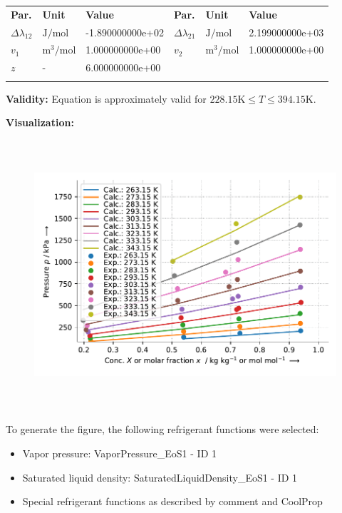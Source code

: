 \begin{longtable}[l]{lll|lll}
\toprule
\addlinespace
\textbf{Par.} & \textbf{Unit} & \textbf{Value} &	\textbf{Par.} & \textbf{Unit} & \textbf{Value} \\
\addlinespace
\midrule
\endhead

\bottomrule
\endfoot
\bottomrule
\endlastfoot
\addlinespace

$\Delta\lambda_{12}$ & $\si{\joule\per\mole}$ & -1.890000000e+02 & $\Delta\lambda_{21}$ & $\si{\joule\per\mole}$ & 2.199000000e+03 \\
$v_1$ & $\si{\cubic\meter\per\mole}$ & 1.000000000e+00 & $v_2$ & $\si{\cubic\meter\per\mole}$ & 1.000000000e+00 \\
$z$ & - & 6.000000000e+00 & & & \\

\addlinespace\end{longtable}

\textbf{Validity:}
\newline
Equation is approximately valid for $228.15 \si{\kelvin} \leq T \leq 394.15 \si{\kelvin}$.
\newline

\textbf{Visualization:}
%
\begin{figure}[!htp]
{\noindent\includegraphics[height=10cm, keepaspectratio]{figs/abs/abs_R-12_naphthenic__WangChao_1.pdf}}
\end{figure}
%

To generate the figure, the following refrigerant functions were selected:
\begin{itemize}
\item Vapor pressure: VaporPressure\_EoS1 - ID 1
\item Saturated liquid density: SaturatedLiquidDensity\_EoS1 - ID 1
\item Special refrigerant functions as described by comment and CoolProp
\end{itemize}

